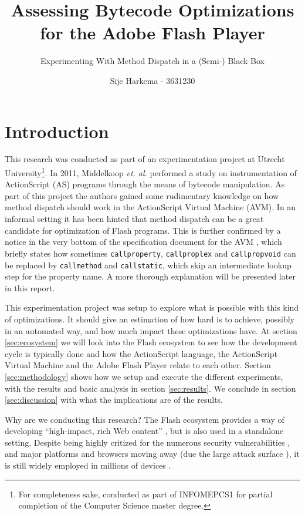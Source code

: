 \documentclass[a4paper,11pt]{scrartcl}
\title{Assessing Bytecode Optimizations for the Adobe Flash Player}
\subtitle{Experimenting With Method Dispatch in a (Semi-) Black Box}
\author{Sije Harkema - 3631230}
\begin{document}
\maketitle

\section{Introduction}
\label{sec:introduction}

This research was conducted as part of an experimentation project at Utrecht University\footnote{For completeness sake, conducted as part of INFOMEPCS1 for partial completion of the Computer Science master degree.}. In 2011, Middelkoop \textit{et. al.} \cite{Middelkoop2011} performed a study on instrumentation of ActionScript (AS) programs through the means of bytecode manipulation. As part of this project the authors gained some rudimentary knowledge on how method dispatch should work in the ActionScript Virtual Machine (AVM). In an informal setting it has been hinted that method dispatch can be a great candidate for optimization of Flash programs. This is further confirmed by a notice in the very bottom of the specification document for the AVM \cite{Adobe2007}, which briefly states how sometimes \texttt{callproperty}, \texttt{callproplex} and \texttt{callpropvoid} can be replaced by \texttt{callmethod} and \texttt{callstatic}, which skip an intermediate lookup step for the property name. A more thorough explanation will be presented later in this report.

This experimentation project was setup to explore what is possible with this kind of optimizations. It should give an estimation of how hard is to achieve, possibly in an automated way, and how much impact these optimizations have. At section \ref{sec:ecosystem} we will look into the Flash ecosystem to see how the development cycle is typically done and how the ActionScript language, the ActionScript Virtual Machine and the Adobe Flash Player relate to each other. Section \ref{sec:methodology} shows how we setup and execute the different experiments, with the results and basic analysis in section \ref{sec:results}. We conclude in section \ref{sec:discussion} with what the implications are of the results.

Why are we conducting this research? The Flash ecosystem provides a way of developing ``high-impact, rich Web content'' \cite{AdobeSystems}, but is also used in a standalone setting. Despite being highly critized for the numerous security vulnerabilities \cite{Van-Acker2012, Symantec2016}, and major platforms and browsers moving away (due the large attack surface \cite{LaForge2016, Seitz2009}), it is still widely employed in millions of devices \cite{AdobeSystemsa}.
\end{document}
